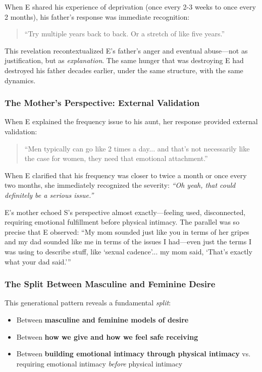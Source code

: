 \documentclass[12pt, letterpaper]{article}
\begin{document}
When E shared his experience of deprivation (once every 2-3 weeks to once every 2 months), his father's response was immediate recognition:

\begin{quote}
``Try multiple years back to back. Or a stretch of like five years.''
\end{quote}

This revelation recontextualized E's father's anger and eventual abuse---not as justification, but as \textit{explanation}. The same hunger that was destroying E had destroyed his father decades earlier, under the same structure, with the same dynamics.

\subsubsection{The Mother's Perspective: External Validation}

When E explained the frequency issue to his aunt, her response provided external validation:

\begin{quote}
``Men typically can go like 2 times a day... and that's not necessarily like the case for women, they need that emotional attachment.''
\end{quote}

When E clarified that his frequency was closer to twice a month or once every two months, she immediately recognized the severity: \textit{``Oh yeah, that could definitely be a serious issue.''}

E's mother echoed S's perspective almost exactly---feeling used, disconnected, requiring emotional fulfillment before physical intimacy. The parallel was so precise that E observed: ``My mom sounded just like you in terms of her gripes and my dad sounded like me in terms of the issues I had---even just the terms I was using to describe stuff, like `sexual cadence'... my mom said, `That's exactly what your dad said.'''

\subsubsection{The Split Between Masculine and Feminine Desire}

This generational pattern reveals a fundamental \textit{split}:

\begin{itemize}
    \item Between \textbf{masculine and feminine models of desire}
    \item Between \textbf{how we give and how we feel safe receiving}
    \item Between \textbf{building emotional intimacy through physical intimacy} vs. requiring emotional intimacy \textit{before} physical intimacy
\end{itemize}
\end{document}

